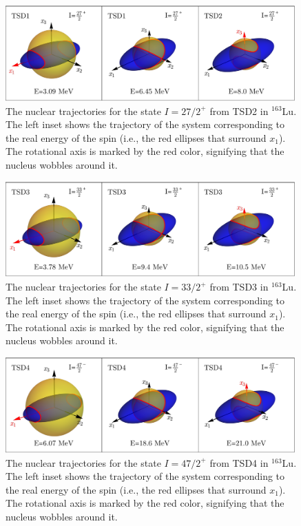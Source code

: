 \begin{figure}
    \centering
    \includegraphics[width=0.99\textwidth]{Chapters/Figures/parity-partners-plots/classical-trajectory-TSD2.pdf}
    \caption{The nuclear trajectories for the state $I=27/2^+$ from TSD2 in $^{163}$Lu. The left inset shows the trajectory of the system corresponding to the real energy of the spin (i.e., the red ellipses that surround $x_1$). The rotational axis is marked by the red color, signifying that the nucleus wobbles around it.}
    \label{classical-trajectory-TSD2-plot}
\end{figure}
\begin{figure}
    \centering
    \includegraphics[width=0.99\textwidth]{Chapters/Figures/parity-partners-plots/classical-trajectory-TSD3.pdf}
    \caption{The nuclear trajectories for the state $I=33/2^+$ from TSD3 in $^{163}$Lu. The left inset shows the trajectory of the system corresponding to the real energy of the spin (i.e., the red ellipses that surround $x_1$). The rotational axis is marked by the red color, signifying that the nucleus wobbles around it.}
    \label{classical-trajectory-TSD3-plot}
\end{figure}
\begin{figure}
    \centering
    \includegraphics[width=0.99\textwidth]{Chapters/Figures/parity-partners-plots/classical-trajectory-TSD4.pdf}
    \caption{The nuclear trajectories for the state $I=47/2^+$ from TSD4 in $^{163}$Lu. The left inset shows the trajectory of the system corresponding to the real energy of the spin (i.e., the red ellipses that surround $x_1$). The rotational axis is marked by the red color, signifying that the nucleus wobbles around it.}
    \label{classical-trajectory-TSD4-plot}
\end{figure}

